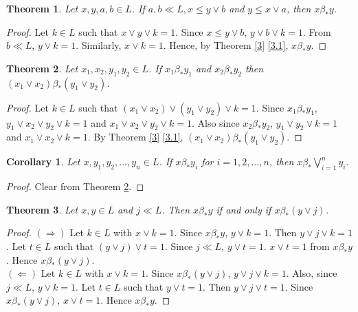 \documentclass[11pt,reqno]{amsart} %
\theoremstyle{plain}
\newtheorem{theorem}{Theorem}
\newtheorem{corollary}{Corollary}
\theoremstyle{definition}
\theoremstyle{remark}
\numberwithin{equation}{section}
\begin{document}
\begin{theorem}\label{17}
  Let $x,y,a,b \in L $. If $ a,b \ll L, x \leq y \vee b $ and $ y \leq x \vee a $, then $ x \beta_* y $.
\end{theorem}

\begin{proof}
  Let $ k \in L $ such that $ x \vee y \vee k = 1 $. Since $ x \leq y \vee b $, $ y \vee b \vee k = 1 $. 
  From $ b \ll L $, $ y \vee k = 1 $. Similarly, $ x \vee k = 1 $. 
  Hence, by Theorem \ref{3} \ref{3.1}, $ x \beta_* y $.
\end{proof}


\begin{theorem}\label{18}
  Let $ x_1,x_2,y_1,y_2 \in L $. If $ x_1 \beta_* y_1 $ and $ x_2 \beta_* y_2 $ then $ ( x_1 \vee x_2 ) \beta_* ( y_1 \vee y_2 ) $.
\end{theorem}

\begin{proof}
  Let $ k \in L $ such that $ (x_1 \vee x_2 ) \vee (y_1 \vee y_2 ) \vee k = 1 $. Since $ x_1 \beta_* y_1 $, 
  $ y_1 \vee x_2 \vee y_2 \vee k = 1 $ and $ x_1 \vee x_2 \vee y_2 \vee k = 1 $. Also since 
  $ x_2 \beta_* y_2 $, $ y_1 \vee y_2 \vee k = 1 $ and $ x_1 \vee x_2 \vee k = 1 $. 
  By Theorem \ref{3} \ref{3.1}, $ ( x_1 \vee x_2 ) \beta_* ( y_1 \vee y_2 ) $.
\end{proof}


\begin{corollary}\label{19}
  Let $ x, y_1, y_2,...,y_n \in L $. If $ x \beta_* y_i $ for $ i=1,2,...,n $, then $ \displaystyle x \beta_* \bigvee_{i=1}^n y_i $.
\end{corollary}
\begin{proof}
  Clear from Theorem \ref{18}.
\end{proof}

\begin{theorem}\label{20}
  Let $ x,y \in L $ and $ j \ll L $. Then $ x \beta_* y $ if and only if $ x \beta_* ( y \vee j ) $.
\end{theorem}

\begin{proof}
  $ ( \Rightarrow ) $ 
  Let $ k \in L $ with $ x \vee k = 1 $. Since $ x \beta_* y $, $ y \vee k = 1 $. Then $ y \vee j \vee k = 1 $. 
  Let $ t \in L $ such that $ ( y \vee j ) \vee t = 1 $. Since $ j \ll L $, $ y \vee t = 1 $. $ x \vee t = 1 $ from $ x \beta_* y $. 
  Hence $ x \beta_* ( y \vee j ) $. \\
  $( \Leftarrow ) $ 
  Let $ k \in L $ with $ x \vee k = 1 $. Since $ x \beta_* ( y \vee j ) $, $ y \vee j \vee k = 1 $. Also, since $ j \ll L $, $ y \vee k = 1 $. 
  Let $ t \in L $ such that $ y \vee t = 1 $. Then $ y \vee j \vee t = 1 $. Since $ x \beta_* ( y \vee j ) $, $ x \vee t = 1 $. Hence $ x \beta_* y $.

\end{proof}
\end{document}
